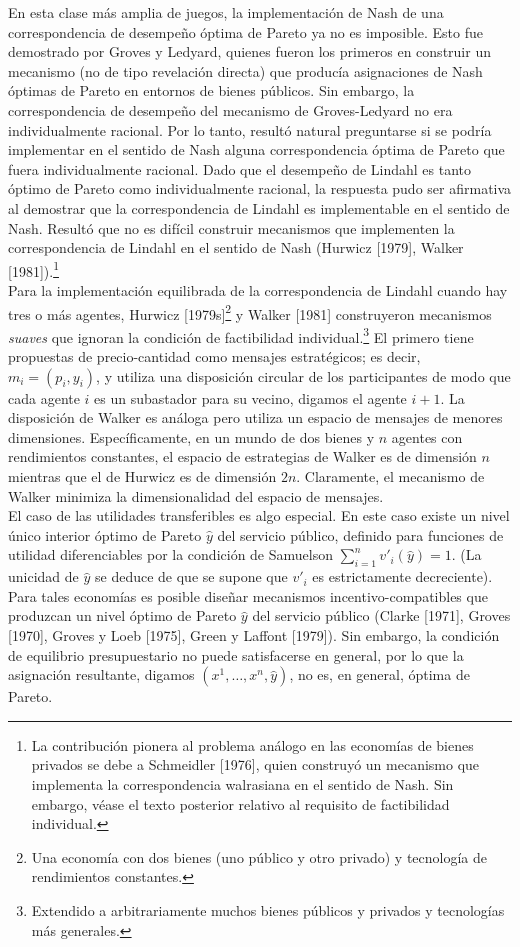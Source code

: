 \documentclass[12pt, letterpaper]{article}
\begin{document}
En esta clase más amplia de juegos, la implementación de Nash de una correspondencia de desempeño óptima de Pareto ya no es imposible. Esto fue demostrado por Groves y Ledyard, quienes fueron los primeros en construir un mecanismo (no de tipo revelación directa) que producía asignaciones de Nash óptimas de Pareto en entornos de bienes públicos. Sin embargo, la correspondencia de desempeño del mecanismo de Groves-Ledyard no era individualmente racional. Por lo tanto, resultó natural preguntarse si se podría implementar en el sentido de Nash alguna correspondencia óptima de Pareto que fuera individualmente racional. Dado que el desempeño de Lindahl es tanto óptimo de Pareto como individualmente racional, la respuesta pudo ser afirmativa al demostrar que la correspondencia de Lindahl es implementable en el sentido de Nash. Resultó que no es difícil construir mecanismos que implementen la correspondencia de Lindahl en el sentido de Nash (Hurwicz [1979], Walker [1981]).\footnote{La contribución pionera al problema análogo en las economías de bienes privados se debe a Schmeidler [1976], quien construyó un mecanismo que implementa la correspondencia walrasiana en el sentido de Nash. Sin embargo, véase el texto posterior relativo al requisito de factibilidad individual.}\\

Para la implementación equilibrada de la correspondencia de Lindahl cuando hay tres o más agentes, Hurwicz [1979s]\footnote{Una economía con dos bienes (uno público y otro privado) y tecnología de rendimientos constantes.} y Walker [1981] construyeron mecanismos \textit{suaves} que ignoran la condición de factibilidad individual.\footnote{Extendido a arbitrariamente muchos bienes públicos y privados y tecnologías más generales.} El primero tiene propuestas de precio-cantidad como mensajes estratégicos; es decir, $m_i = (p_i, y_i)$, y utiliza una disposición circular de los participantes de modo que cada agente $i$ es un subastador para su vecino, digamos el agente $i + 1$. La disposición de Walker es análoga pero utiliza un espacio de mensajes de menores dimensiones. Específicamente, en un mundo de dos bienes y $n$ agentes con rendimientos constantes, el espacio de estrategias de Walker es de dimensión $n$ mientras que el de Hurwicz es de dimensión $2n$. Claramente, el mecanismo de Walker minimiza la dimensionalidad del espacio de mensajes. \\

El caso de las utilidades transferibles es algo especial. En este caso existe un nivel único interior óptimo de Pareto $\hat{y}$ del servicio público, definido para funciones de utilidad diferenciables por la condición de Samuelson $\sum_{i=1}^n v'_i(\hat{y}) = 1$. (La unicidad de $\hat{y}$ se deduce de que se supone que $v'_i$ es estrictamente decreciente). Para tales economías es posible diseñar mecanismos incentivo-compatibles que produzcan un nivel óptimo de Pareto $\hat{y}$ del servicio público (Clarke [1971], Groves [1970], Groves y Loeb [1975], Green y Laffont [1979]). Sin embargo, la condición de equilibrio presupuestario no puede satisfacerse en general, por lo que la asignación resultante, digamos $(x^{1}, \dots, x^{n}, \hat{y})$, no es, en general, óptima de Pareto. \\
\end{document}
